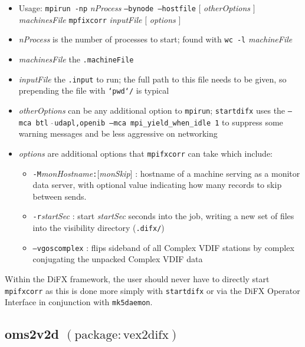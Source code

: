 \begin{itemize}
\item[] Usage: {\tt mpirun -np} {\em nProcess} {\tt --bynode --hostfile} $[$ {\em otherOptions} $]$ {\em machinesFile} {\tt mpfixcorr} {\em inputFile} $[$ {\em options} $]$
\item[] {\em nProcess} is the number of processes to start; found with {\tt wc -l} {\em machineFile}
\item[] {\em machinesFile} the {\tt .machineFile}
\item[] {\em inputFile} the {\tt .input} to run; the full path to this file needs to be given, so prepending the file with {\tt `pwd`/} is typical
\item[] {\em otherOptions} can be any additional option to {\tt mpirun}; {\tt startdifx} uses the {\tt --mca btl $\hat{\ }$udapl,openib --mca mpi\_yield\_when\_idle 1} to suppress some warning messages and be less aggressive on networking
\item[] {\em options} are additional options that {\tt mpifxcorr} can take which include:
\begin{itemize}
\item[] {\tt -M}{\em monHostname}{\tt :}$[${\em monSkip}$]$ : hostname of a machine serving as a monitor data server, with optional value indicating how many records to skip between sends.
\item[] {\tt -r}{\em startSec} : start {\em startSec} seconds into the job, writing a new set of files into the visibility directory ({\tt .difx/})
\item[] {\tt --vgoscomplex} : flips sideband of all Complex VDIF stations by complex conjugating the unpacked Complex VDIF data
\end{itemize}
\end{itemize}

Within the DiFX framework, the user should never have to directly start {\tt mpifxcorr} as this is done more simply with {\tt startdifx} or via the DiFX Operator Interface in conjunction with {\tt mk5daemon}.










\subsection{oms2v2d {\small $\mathrm{(package: vex2difx)}$} \label{sec:oms2v2d}}

